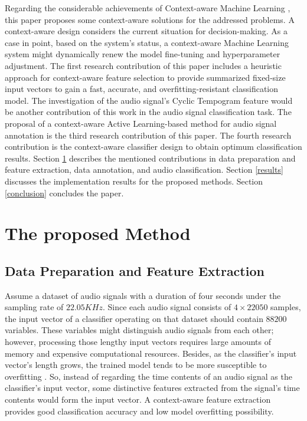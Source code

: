 \documentclass{article}
\begin{document}
Regarding the considerable achievements of Context-aware Machine Learning \citep{Zeng}, this paper proposes some context-aware solutions for the addressed problems. A context-aware design considers the current situation for decision-making. As a case in point, based on the system's status, a context-aware Machine Learning system might dynamically renew the model fine-tuning and hyperparameter adjustment. The first research contribution of this paper includes a heuristic approach for context-aware feature selection to provide summarized fixed-size input vectors to gain a fast, accurate, and overfitting-resistant classification model. The investigation of the audio signal's Cyclic Tempogram feature would be another contribution of this work in the audio signal classification task. The proposal of a context-aware Active Learning-based method for audio signal annotation is the third research contribution of this paper. The fourth research contribution is the context-aware classifier design to obtain optimum classification results. Section \ref{method} describes the mentioned contributions in data preparation and feature extraction, data annotation, and audio classification. Section \ref{results} discusses the implementation results for the proposed methods. Section \ref{conclusion} concludes the paper.

\section{The proposed Method}
\label{method}

\subsection{Data Preparation and Feature Extraction}
\label{ablation}
Assume a dataset of audio signals with a duration of four seconds under the sampling rate of $22.05KHz$. Since each audio signal consists of $4\times 22050$ samples, the input vector of a classifier operating on that dataset should contain $88200$ variables. These variables might distinguish audio signals from each other; however, processing those lengthy input vectors requires large amounts of memory and expensive computational resources. Besides, as the classifier's input vector's length grows, the trained model tends to be more susceptible to overfitting \citep{Elements}. So, instead of regarding the time contents of an audio signal as the classifier's input vector, some distinctive features extracted from the signal's time contents would form the input vector. A context-aware feature extraction provides good classification accuracy and low model overfitting possibility. 
\end{document}

